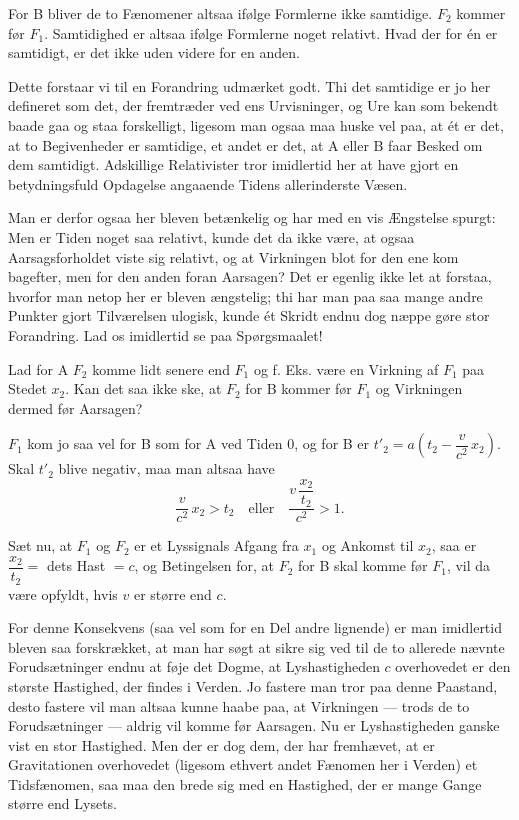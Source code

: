\documentclass[12pt,a4paper]{article}
\newcommand{\opage}[1]{\marginnote{\footnotesize\textit{[#1]}}}
\begin{document}
For B bliver de to Fænomener altsaa ifølge Formlerne ikke samtidige. $F_{2}$
kommer før $F_{1}$. Samtidighed er altsaa ifølge Formlerne noget relativt. Hvad
der for én er samtidigt, er det ikke uden videre for en anden.

Dette forstaar vi til en Forandring udmærket godt. Thi det samtidige er jo her
defineret som det, der fremtræder ved ens Urvisninger, og Ure kan som bekendt
baade gaa og staa forskelligt, ligesom man ogsaa maa huske vel paa, at ét er
det, at to Begivenheder er samtidige, et andet er det, at A eller B faar Besked
om dem samtidigt. Adskillige Relativister tror imidlertid her at have gjort en
betydningsfuld Opdagelse angaaende Tidens allerinderste Væsen.

Man er derfor ogsaa her bleven betænkelig og har med en vis Ængstelse spurgt:
Men er Tiden noget saa relativt, kunde det da ikke være, at ogsaa
Aarsagsforholdet viste sig relativt, og at Virkningen blot for den ene kom
bagefter, men for den anden foran Aarsagen? Det er egenlig ikke let at forstaa,
hvorfor man netop her er bleven ængstelig; thi har man paa saa mange andre
Punkter gjort Tilværelsen ulogisk, kunde ét Skridt endnu dog næppe gøre stor
Forandring. Lad os imidlertid se paa Spørgsmaalet!

\opage{27} Lad for A $F_{2}$ komme lidt senere end $F_{1}$ og f. Eks. være en Virkning af
$F_{1}$ paa Stedet $x_{2}$. Kan det saa ikke ske, at $F_{2}$ for B kommer før
$F_{1}$ og Virkningen dermed før Aarsagen?

$F_{1}$ kom jo saa vel for B som for A ved Tiden 0, og for B er
$t'_{2} = a\left(t_{2} - \dfrac{v}{c^{2}}\,x_{2}\right)$. Skal $t'_{2}$ blive
negativ, maa man altsaa have
\[
  \frac{v}{c^{2}}\,x_{2} > t_{2} \quad \text{eller} \quad
  \frac{v\,\dfrac{x_{2}}{t_{2}}}{c^{2}} > 1.
\]

Sæt nu, at $F_{1}$ og $F_{2}$ er et Lyssignals Afgang fra $x_{1}$ og Ankomst
til $x_{2}$, saa er $\dfrac{x_{2}}{t_{2}} =$ dets Hast $= c$, og Betingelsen
for, at $F_{2}$ for B skal komme før $F_{1}$, vil da være opfyldt, hvis $v$ er
større end $c$.

For denne Konsekvens (saa vel som for en Del andre lignende) er man imidlertid
bleven saa forskrækket, at man har søgt at sikre sig ved til de to allerede
nævnte Forudsætninger endnu at føje det Dogme, at Lyshastigheden $c$
overhovedet er den største Hastighed, der findes i Verden. Jo fastere man tror
paa denne Paastand, desto fastere vil man altsaa kunne haabe paa, at Virkningen
--- trods de to Forudsætninger --- aldrig vil komme før Aarsagen. Nu er
Lyshastigheden ganske vist en stor Hastighed. Men der er dog dem, der har
fremhævet, at er Gravitationen overhovedet (ligesom ethvert andet Fænomen her i
Verden) et Tidsfænomen, saa maa den brede sig med en Hastighed, der er mange
Gange større end Lysets.
\end{document}
